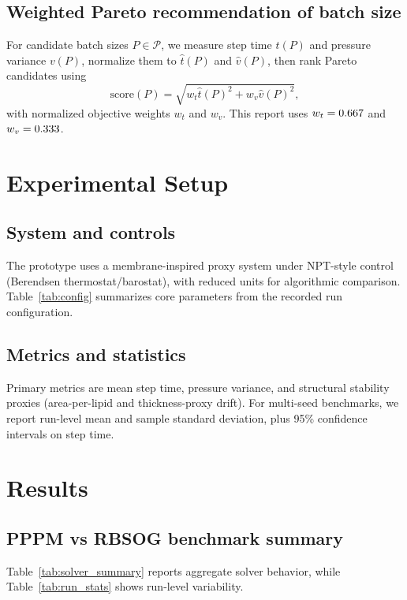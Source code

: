 \documentclass[conference]{IEEEtran}
\begin{document}
\subsection{Weighted Pareto recommendation of batch size}
For candidate batch sizes $P \in \mathcal{P}$,
we measure step time $t(P)$ and pressure variance $v(P)$,
normalize them to $\hat{t}(P)$ and $\hat{v}(P)$,
then rank Pareto candidates using
\begin{equation}
\mathrm{score}(P)=\sqrt{w_t\hat{t}(P)^2 + w_v\hat{v}(P)^2},
\label{eq:weighted_score}
\end{equation}
with normalized objective weights $w_t$ and $w_v$.
This report uses $w_t=0.667$ and $w_v=0.333$.

\section{Experimental Setup}
\subsection{System and controls}
The prototype uses a membrane-inspired proxy system under NPT-style control
(Berendsen thermostat/barostat), with reduced units for algorithmic comparison.
Table~\ref{tab:config} summarizes core parameters from the recorded run configuration.

\begin{table}[t]
\caption{Core simulation and kernel settings used in this report.}
\label{tab:config}
\centering

\end{table}

\subsection{Metrics and statistics}
Primary metrics are mean step time, pressure variance,
and structural stability proxies (area-per-lipid and thickness-proxy drift).
For multi-seed benchmarks, we report run-level mean and sample standard deviation,
plus 95\% confidence intervals on step time.

\section{Results}
\subsection{PPPM vs RBSOG benchmark summary}
Table~\ref{tab:solver_summary} reports aggregate solver behavior,
while Table~\ref{tab:run_stats} shows run-level variability.
\end{document}

